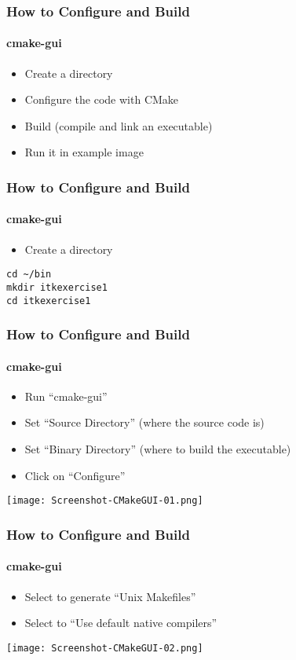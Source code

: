 \begin{frame}
\frametitle{How to Configure and Build}
\framesubtitle{cmake-gui}
\begin{itemize}
\item Create a directory
\item Configure the code with CMake
\item Build (compile and link an executable)
\item Run it in example image
\end{itemize}
\end{frame}

\begin{frame}[fragile]
\frametitle{How to Configure and Build}
\framesubtitle{cmake-gui}
\begin{itemize}
\item Create a directory
\end{itemize}
\begin{verbatim}
cd ~/bin
mkdir itkexercise1
cd itkexercise1
\end{verbatim}
\end{frame}

\begin{frame}[fragile]
\frametitle{How to Configure and Build}
\framesubtitle{cmake-gui}
\begin{itemize}
\item Run ``cmake-gui''
\item Set ``Source Directory'' (where the source code is)
\item Set ``Binary Directory'' (where to build the executable)
\item Click on ``Configure''
\end{itemize}
\begin{center}
  \texttt{[image: Screenshot-CMakeGUI-01.png]}
\end{center}
\end{frame}

\begin{frame}[fragile]
\frametitle{How to Configure and Build}
\framesubtitle{cmake-gui}
\begin{itemize}
\item Select to generate ``Unix Makefiles''
\item Select to ``Use default native compilers''
\end{itemize}
\begin{center}
  \texttt{[image: Screenshot-CMakeGUI-02.png]}
\end{center}
\end{frame}

